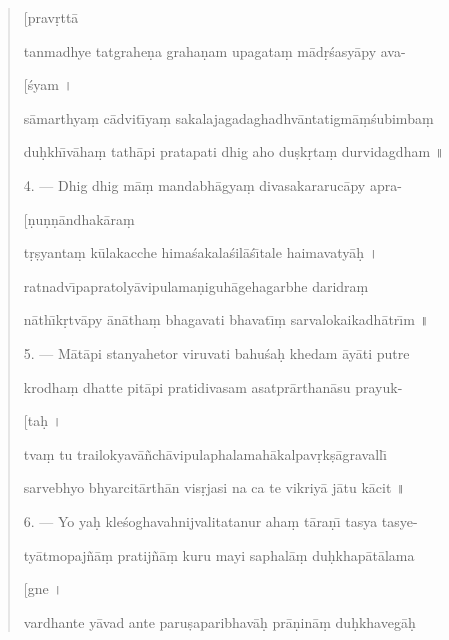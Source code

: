 \documentclass[a4paper, 11pt, oneside, french, landscape, twocolumn]{article}
\begin{document}
\begin{quotation}
\hspace*{55mm}[prav\d{r}tt\={a}

tanmadhye tatgrahe\d{n}a graha\d{n}am upagata\d{m} m\={a}d\d{r}\'{s}asy\={a}py ava-

\hspace*{55mm}[\'{s}yam \texthindi{।}

s\={a}marthya\d{m} c\={a}dvit\={\i}ya\d{m} sakalajagadaghadhv\={a}ntatigm\={a}\d{m}\'{s}ubimba\d{m}

du\d{h}kh\={\i}v\={a}ha\d{m} tath\={a}pi pratapati dhig aho du\d{s}k\d{r}ta\d{m} durvidagdham \texthindi{॥}

\bigskip

4. --- Dhig dhig m\={a}\d{m} mandabh\={a}gya\d{m} divasakararuc\={a}py apra-

\hspace*{55mm}[\d{n}u\d{n}\d{n}\={a}ndhak\={a}ra\d{m}

t\d{r}\d{s}yanta\d{m} k\={u}lakacche hima\'{s}akala\'{s}il\={a}\'{s}\={\i}tale haimavaty\={a}\d{h} \texthindi{।}

ratnadv\={\i}papratoly\={a}vipulama\d{n}iguh\={a}gehagarbhe daridra\d{m}

n\={a}th\={\i}k\d{r}tv\={a}py \={a}n\={a}tha\d{m} bhagavati bhavat\={\i}\d{m} sarvalokaikadh\={a}tr\={\i}m \texthindi{॥}

\bigskip

5. --- M\={a}t\={a}pi stanyahetor viruvati bahu\'{s}a\d{h} khedam \={a}y\={a}ti putre

krodha\d{m} dhatte pit\={a}pi pratidivasam asatpr\={a}rthan\={a}su prayuk-

\hspace*{55mm}[ta\d{h} \texthindi{।}

tva\d{m} tu trailokyav\={a}\~{n}ch\={a}vipulaphalamah\={a}kalpav\d{r}k\d{s}\={a}gravall\={\i}

sarvebhyo bhyarcit\={a}rth\={a}n vis\d{r}jasi na ca te vikriy\={a} j\={a}tu k\={a}cit \texthindi{॥}

\bigskip

6. --- Yo ya\d{h} kle\'{s}oghavahnijvalitatanur aha\d{m} t\={a}ra\d{n}\={\i} tasya tasye-

ty\={a}tmopaj\~{n}\={a}\d{m} pratij\~{n}\={a}\d{m} kuru mayi saphal\={a}\d{m} du\d{h}khap\={a}t\={a}lama

\hspace*{55mm}[gne \texthindi{।}

vardhante y\={a}vad ante paru\d{s}aparibhav\={a}\d{h} pr\={a}\d{n}in\={a}\d{m} du\d{h}khaveg\={a}\d{h}


\end{quotation}
\end{document}
